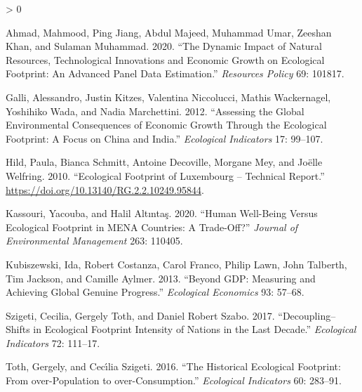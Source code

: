 \documentclass[
]{article}
\newlength{\cslhangindent}
\newenvironment{CSLReferences}[2] %
 {%
  \setlength{\parindent}{0pt}
  \ifodd #1 \everypar{\setlength{\hangindent}{\cslhangindent}}\ignorespaces\fi
  \ifnum #2 > 0
  \setlength{\parskip}{#2\baselineskip}
  \fi
 }%
 {}
\begin{document}
\hypertarget{refs}{}
\begin{CSLReferences}{1}{0}
\leavevmode\hypertarget{ref-ahmad2020dynamic}{}%
Ahmad, Mahmood, Ping Jiang, Abdul Majeed, Muhammad Umar, Zeeshan Khan,
and Sulaman Muhammad. 2020. {``The Dynamic Impact of Natural Resources,
Technological Innovations and Economic Growth on Ecological Footprint:
An Advanced Panel Data Estimation.''} \emph{Resources Policy} 69:
101817.

\leavevmode\hypertarget{ref-galli2012assessing}{}%
Galli, Alessandro, Justin Kitzes, Valentina Niccolucci, Mathis
Wackernagel, Yoshihiko Wada, and Nadia Marchettini. 2012. {``Assessing
the Global Environmental Consequences of Economic Growth Through the
Ecological Footprint: A Focus on China and India.''} \emph{Ecological
Indicators} 17: 99--107.

\leavevmode\hypertarget{ref-unknown}{}%
Hild, Paula, Bianca Schmitt, Antoine Decoville, Morgane Mey, and Joëlle
Welfring. 2010. {``Ecological Footprint of Luxembourg -- Technical
Report.''} \url{https://doi.org/10.13140/RG.2.2.10249.95844}.

\leavevmode\hypertarget{ref-kassouri2020human}{}%
Kassouri, Yacouba, and Halil Altıntaş. 2020. {``Human Well-Being Versus
Ecological Footprint in MENA Countries: A Trade-Off?''} \emph{Journal of
Environmental Management} 263: 110405.

\leavevmode\hypertarget{ref-kubiszewski2013beyond}{}%
Kubiszewski, Ida, Robert Costanza, Carol Franco, Philip Lawn, John
Talberth, Tim Jackson, and Camille Aylmer. 2013. {``Beyond GDP:
Measuring and Achieving Global Genuine Progress.''} \emph{Ecological
Economics} 93: 57--68.

\leavevmode\hypertarget{ref-szigeti2017decoupling}{}%
Szigeti, Cecilia, Gergely Toth, and Daniel Robert Szabo. 2017.
{``Decoupling--Shifts in Ecological Footprint Intensity of Nations in
the Last Decade.''} \emph{Ecological Indicators} 72: 111--17.

\leavevmode\hypertarget{ref-toth2016historical}{}%
Toth, Gergely, and Cecı́lia Szigeti. 2016. {``The Historical Ecological
Footprint: From over-Population to over-Consumption.''} \emph{Ecological
Indicators} 60: 283--91.

\end{CSLReferences}
\end{document}
